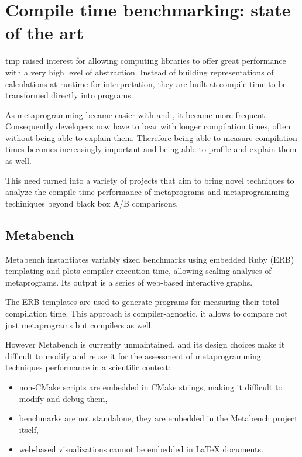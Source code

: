 \documentclass[../main]{subfiles}
\begin{document}
\section{
  Compile time benchmarking: state of the art
}

\cpp \gls{tmp} raised interest for allowing computing libraries
to offer great performance with a very high level of abstraction.
Instead of building representations of calculations at runtime for
interpretation, they are built at compile time to be transformed directly into
programs.

As metaprogramming became easier with  and ,
it became more frequent. Consequently developers now have to bear with longer
compilation times, often without being able to explain them.
Therefore being able to measure compilation times becomes increasingly important
and being able to profile and explain them as well.

This need turned into a variety of projects that aim to bring novel techniques
to analyze the compile time performance of \cpp metaprograms and metaprogramming
techiniques beyond black box A/B comparisons.

%

\subsection{
  Metabench
}

Metabench\cite{metabench} instantiates variably sized benchmarks using
embedded Ruby (ERB) templating and plots compiler execution time, allowing
scaling analyses of metaprograms. Its output is a series of web-based
interactive graphs.

The ERB templates are used to generate \cpp programs for measuring their
total compilation time. This approach is compiler-agnostic, it allows to compare
not just metaprograms but compilers as well.

However Metabench is currently unmaintained, and its design choices make it
difficult to modify and reuse it for the assessment of metaprogramming
techniques performance in a scientific context:

\begin{itemize}
\item
non-CMake scripts are embedded in CMake strings, making it difficult to modify
and debug them,

\item
benchmarks are not standalone, they are embedded in the Metabench
project itself,

\item
web-based visualizations cannot be embedded in \LaTeX{} documents.
\end{itemize}
\end{document}
